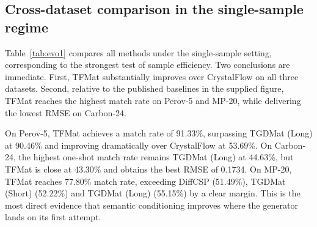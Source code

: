 \documentclass[fleqn,10pt]{wlscirep}
\begin{document}
\subsection*{Cross-dataset comparison in the single-sample regime}
Table~\ref{tab:evo1} compares all methods under the single-sample setting, corresponding to the strongest test of sample efficiency. Two conclusions are immediate. First, TFMat substantially improves over CrystalFlow on all three datasets. Second, relative to the published baselines in the supplied figure, TFMat reaches the highest match rate on Perov-5 and MP-20, while delivering the lowest RMSE on Carbon-24.

On Perov-5, TFMat achieves a match rate of 91.33\%, surpassing TGDMat (Long) at 90.46\% and improving dramatically over CrystalFlow at 53.69\%. On Carbon-24, the highest one-shot match rate remains TGDMat (Long) at 44.63\%, but TFMat is close at 43.30\% and obtains the best RMSE of 0.1734. On MP-20, TFMat reaches 77.80\% match rate, exceeding DiffCSP (51.49\%), TGDMat (Short) (52.22\%) and TGDMat (Long) (55.15\%) by a clear margin. This is the most direct evidence that semantic conditioning improves where the generator lands on its first attempt.

\begin{table}[ht]
\centering
\caption{\textbf{Single-sample comparison across Perov-5, Carbon-24 and MP-20 (best in bold; second-best underlined).} Values for P-cG-SchNet, CDVAE, DiffCSP and TGDMat are extracted from the supplied benchmark figure. Values for CrystalFlow and TFMat are taken from the provided one-sample evaluation summary. Bold and underlining indicate the best and second-best results in each column, respectively.}
\label{tab:evo1}
\small
\setlength{\tabcolsep}{4pt}
\end{table}
\end{document}
